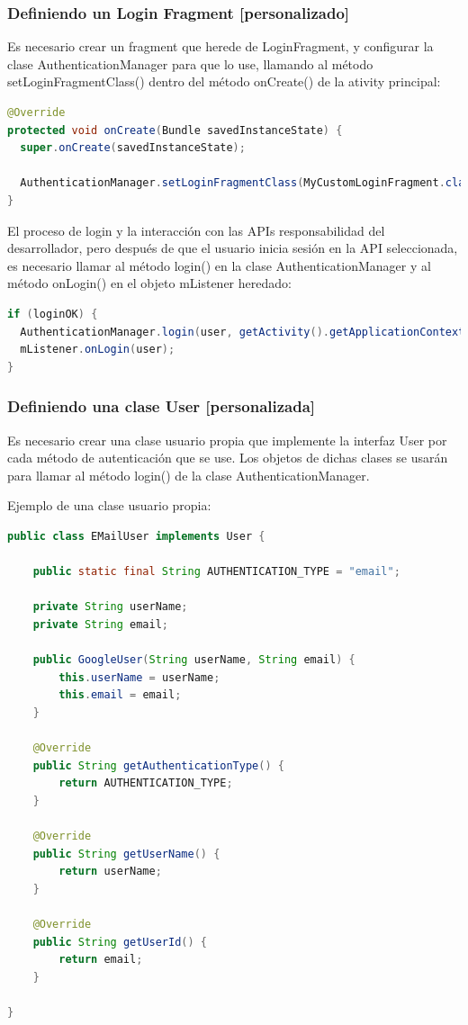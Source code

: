 \subsubsection{Definiendo un Login Fragment [personalizado]}

Es necesario crear un fragment que herede de LoginFragment, y configurar la clase AuthenticationManager para que lo use, llamando al método setLoginFragmentClass() dentro del método onCreate() de la ativity principal:

\begin{lstlisting}[language=Java, frame=tlb]	
@Override
protected void onCreate(Bundle savedInstanceState) {
  super.onCreate(savedInstanceState);
	
  AuthenticationManager.setLoginFragmentClass(MyCustomLoginFragment.class);
}
\end{lstlisting}

El proceso de login y la interacción con las APIs responsabilidad del desarrollador, pero después de que el usuario inicia sesión en la API seleccionada, es necesario llamar al método login() en la clase AuthenticationManager y al método onLogin() en el objeto mListener heredado:

\begin{lstlisting}[language=Java, frame=tlb]	
if (loginOK) {
  AuthenticationManager.login(user, getActivity().getApplicationContext());
  mListener.onLogin(user);
}
\end{lstlisting}


\subsubsection{Definiendo una clase User [personalizada]}

Es necesario crear una clase usuario propia que implemente la interfaz User por cada método de autenticación que se use. Los objetos de dichas clases se usarán para llamar al método login() de la clase AuthenticationManager.

Ejemplo de una clase usuario propia:
\begin{lstlisting}[language=Java, frame=tlb]	
public class EMailUser implements User {

    public static final String AUTHENTICATION_TYPE = "email";

    private String userName;
    private String email;

    public GoogleUser(String userName, String email) {
        this.userName = userName;
        this.email = email;
    }

    @Override
    public String getAuthenticationType() {
        return AUTHENTICATION_TYPE;
    }

    @Override
    public String getUserName() {
        return userName;
    }

    @Override
    public String getUserId() {
        return email;
    }

}
\end{lstlisting}



